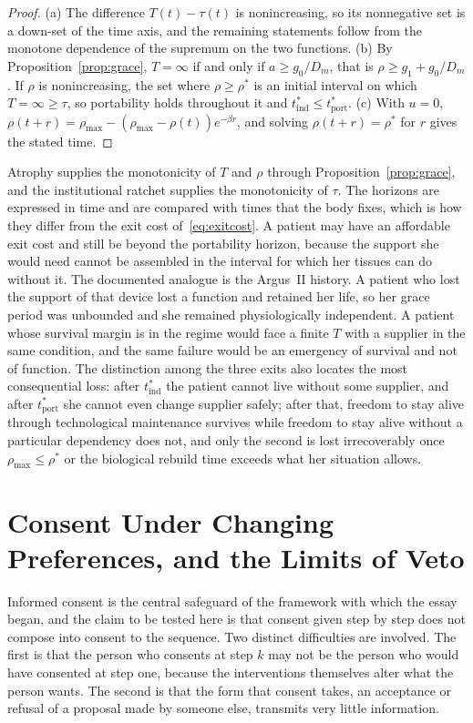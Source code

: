 \documentclass[11pt]{article}
\theoremstyle{plain}
\theoremstyle{definition}
\theoremstyle{remark}
\begin{document}
\begin{proof}
(a) The difference $T(t)-\tau(t)$ is nonincreasing, so its nonnegative set is a down-set of the time axis, and the remaining statements follow from the monotone dependence of the supremum on the two functions. (b) By Proposition~\ref{prop:grace}, $T=\infty$ if and only if $a\ge g_0/D_m$, that is $\rho\ge g_1+g_0/D_m$. If $\rho$ is nonincreasing, the set where $\rho\ge\rho^\ast$ is an initial interval on which $T=\infty\ge\tau$, so portability holds throughout it and $t^\ast_{\mathrm{ind}}\le t^\ast_{\mathrm{port}}$. (c) With $u=0$, $\rho(t+r)=\rho_{\max}-(\rho_{\max}-\rho(t))e^{-\beta r}$, and solving $\rho(t+r)=\rho^\ast$ for $r$ gives the stated time.
\end{proof}

Atrophy supplies the monotonicity of $T$ and $\rho$ through Proposition~\ref{prop:grace}, and the institutional ratchet supplies the monotonicity of $\tau$. The horizons are expressed in time and are compared with times that the body fixes, which is how they differ from the exit cost of~\eqref{eq:exitcost}. A patient may have an affordable exit cost and still be beyond the portability horizon, because the support she would need cannot be assembled in the interval for which her tissues can do without it. The documented analogue is the Argus~II history. A patient who lost the support of that device lost a function and retained her life, so her grace period was unbounded and she remained physiologically independent. A patient whose survival margin is in the regime would face a finite $T$ with a supplier in the same condition, and the same failure would be an emergency of survival and not of function. The distinction among the three exits also locates the most consequential loss: after $t^\ast_{\mathrm{ind}}$ the patient cannot live without some supplier, and after $t^\ast_{\mathrm{port}}$ she cannot even change supplier safely; after that, freedom to stay alive through technological maintenance survives while freedom to stay alive without a particular dependency does not, and only the second is lost irrecoverably once $\rho_{\max}\le\rho^\ast$ or the biological rebuild time exceeds what her situation allows.

\section{Consent Under Changing Preferences, and the Limits of Veto}\label{sec:consent}

Informed consent is the central safeguard of the framework with which the essay began, and the claim to be tested here is that consent given step by step does not compose into consent to the sequence. Two distinct difficulties are involved. The first is that the person who consents at step $k$ may not be the person who would have consented at step one, because the interventions themselves alter what the person wants. The second is that the form that consent takes, an acceptance or refusal of a proposal made by someone else, transmits very little information.
\end{document}

